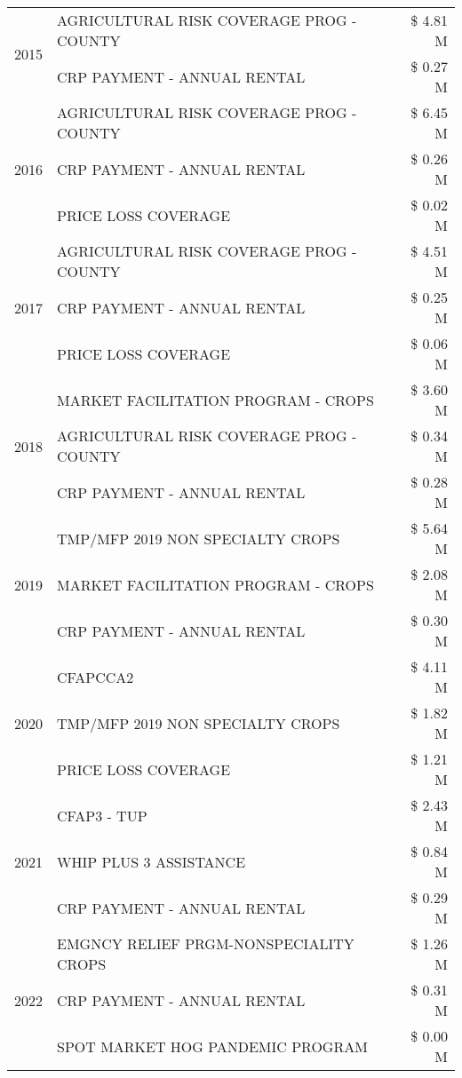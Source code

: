 \begin{tabular}{llr}
\cline{1-3}
\multirow[t]{2}{*}{2015} & AGRICULTURAL RISK COVERAGE PROG - COUNTY & \$ 4.81 M \\
 & CRP PAYMENT - ANNUAL RENTAL & \$ 0.27 M \\
\cline{1-3}
\multirow[t]{3}{*}{2016} & AGRICULTURAL RISK COVERAGE PROG - COUNTY & \$ 6.45 M \\
 & CRP PAYMENT - ANNUAL RENTAL & \$ 0.26 M \\
 & PRICE LOSS COVERAGE & \$ 0.02 M \\
\cline{1-3}
\multirow[t]{3}{*}{2017} & AGRICULTURAL RISK COVERAGE PROG - COUNTY & \$ 4.51 M \\
 & CRP PAYMENT - ANNUAL RENTAL & \$ 0.25 M \\
 & PRICE LOSS COVERAGE & \$ 0.06 M \\
\cline{1-3}
\multirow[t]{3}{*}{2018} & MARKET FACILITATION PROGRAM - CROPS & \$ 3.60 M \\
 & AGRICULTURAL RISK COVERAGE PROG - COUNTY & \$ 0.34 M \\
 & CRP PAYMENT - ANNUAL RENTAL & \$ 0.28 M \\
\cline{1-3}
\multirow[t]{3}{*}{2019} & TMP/MFP 2019 NON SPECIALTY CROPS & \$ 5.64 M \\
 & MARKET FACILITATION PROGRAM - CROPS & \$ 2.08 M \\
 & CRP PAYMENT - ANNUAL RENTAL & \$ 0.30 M \\
\cline{1-3}
\multirow[t]{3}{*}{2020} & CFAPCCA2 & \$ 4.11 M \\
 & TMP/MFP 2019 NON SPECIALTY CROPS & \$ 1.82 M \\
 & PRICE LOSS COVERAGE & \$ 1.21 M \\
\cline{1-3}
\multirow[t]{3}{*}{2021} & CFAP3 - TUP & \$ 2.43 M \\
 & WHIP PLUS 3 ASSISTANCE & \$ 0.84 M \\
 & CRP PAYMENT - ANNUAL RENTAL & \$ 0.29 M \\
\cline{1-3}
\multirow[t]{3}{*}{2022} & EMGNCY RELIEF PRGM-NONSPECIALITY CROPS & \$ 1.26 M \\
 & CRP PAYMENT - ANNUAL RENTAL & \$ 0.31 M \\
 & SPOT MARKET HOG PANDEMIC PROGRAM & \$ 0.00 M \\
\cline{1-3}
\bottomrule
\end{tabular}
